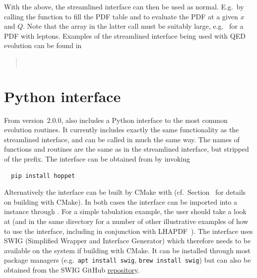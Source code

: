 With the above, the streamlined interface can then be used as normal.
%
E.g.\ by calling the  function to fill the PDF
table and  to evaluate the PDF at a given $x$
and $Q$.
%
Note that the  array in the latter call must be
suitably large, e.g.\  for a PDF with leptons.
%
Examples of the streamlined interface being used with QED evolution
can be found in
\begin{quote}
  \\
\end{quote}

\section{Python interface}
\label{sec:pyinterface}
From version~2.0.0, \hoppet also includes a Python interface to the
most common evolution routines. It currently includes exactly the same
functionality as the streamlined interface, and can be called in much
the same way. The names of functions and routines are the same as in
the streamlined interface, but stripped of the 
prefix. The interface can be obtained from  by invoking
\begin{lstlisting}
  pip install hoppet
\end{lstlisting}
Alternatively the interface can be built by CMake with
 (cf.\ Section~
for details on building with CMake). In both cases the interface
can be imported into a  instance through .
%
For a simple tabulation example, the user should take a look
at
(and in the same directory for a number of other illustrative examples
of how to use the interface, including in conjunction with
LHAPDF~\cite{LHAPDF}). The interface uses SWIG (Simplified Wrapper and
Interface Generator) which therefore needs to be available on the
system if building with CMake. It can be installed through most
package managers (e.g.\ \texttt{apt install swig}, \texttt{brew
  install swig}) but can also be obtained from the SWIG GitHub
\href{https://github.com/swig}{repository}.

